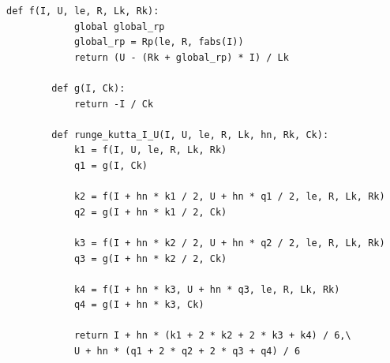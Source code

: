 \documentclass[14pt, a4paper]{extarticle}
\begin{document}
	\begin{lstlisting}[caption=Решение системы уравнений методом Рунге-Кутта]	
		def f(I, U, le, R, Lk, Rk):
			global global_rp
			global_rp = Rp(le, R, fabs(I))
			return (U - (Rk + global_rp) * I) / Lk
		
		def g(I, Ck):
			return -I / Ck
		
		def runge_kutta_I_U(I, U, le, R, Lk, hn, Rk, Ck):
			k1 = f(I, U, le, R, Lk, Rk)
			q1 = g(I, Ck)
			
			k2 = f(I + hn * k1 / 2, U + hn * q1 / 2, le, R, Lk, Rk)
			q2 = g(I + hn * k1 / 2, Ck)
			
			k3 = f(I + hn * k2 / 2, U + hn * q2 / 2, le, R, Lk, Rk)
			q3 = g(I + hn * k2 / 2, Ck)
			
			k4 = f(I + hn * k3, U + hn * q3, le, R, Lk, Rk)
			q4 = g(I + hn * k3, Ck)
			
			return I + hn * (k1 + 2 * k2 + 2 * k3 + k4) / 6,\
			U + hn * (q1 + 2 * q2 + 2 * q3 + q4) / 6
	\end{lstlisting}

	
\end{document}
